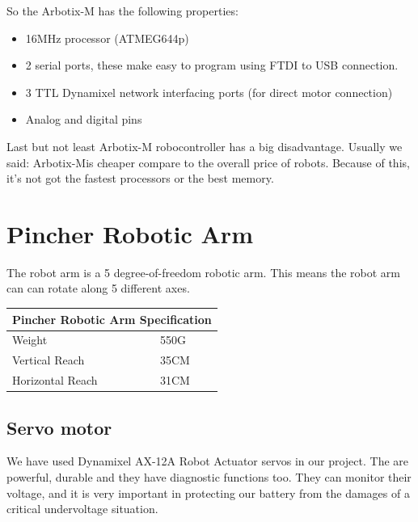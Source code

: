 		So the Arbotix-M has the following properties:
		
		\begin{itemize}
			\item 16MHz processor (ATMEG644p)
			\item 2 serial ports, these make easy to program using FTDI to USB connection.
			\item 3 TTL Dynamixel network interfacing ports (for direct motor connection)
			\item Analog and digital pins
		\end{itemize}

		Last but not least Arbotix-M robocontroller has a big disadvantage. Usually we said: Arbotix-Mis cheaper compare to the overall price of robots. Because of this, it’s not got the fastest processors or the best memory.
	
	\section{Pincher Robotic Arm}
	
		\hspace{15pt}The robot arm is a 5 degree-of-freedom robotic arm. This means the robot arm can can rotate along 5 different axes. \cite{arduino1}
		
		\begin{table}[ht]
			\begin{tabular}{|l|l|}
				\hline
				\multicolumn{2}{|l|}{\textbf{Pincher Robotic Arm Specification}} \\ \hline
				Weight                                & 550G                     \\ \hline
				Vertical Reach                        & 35CM                     \\ \hline
				Horizontal Reach                      & 31CM                     \\ \hline
			\end{tabular}
		\end{table}
		
		\subsection{Servo motor}
	
			\hspace{15pt}We have used Dynamixel AX-12A Robot Actuator servos in our project. The are powerful, durable and they have diagnostic functions too. They can monitor their voltage, and it is very important in protecting our battery from the damages of a critical undervoltage situation.

